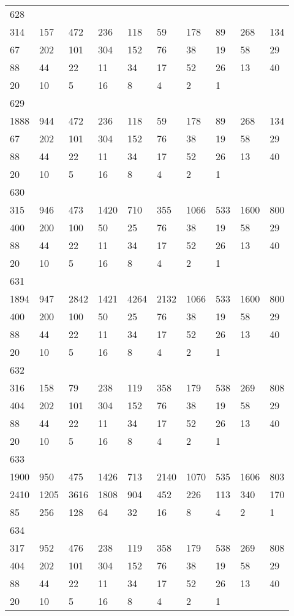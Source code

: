 \begin{longtable}{*{10}{l}}
628&&&&&&&&&\\
314& 157& 472& 236& 118& 59& 178& 89& 268& 134\\
67& 202& 101& 304& 152& 76& 38& 19& 58& 29\\
88& 44& 22& 11& 34& 17& 52& 26& 13& 40\\
20& 10& 5& 16& 8& 4& 2& 1& \\

629&&&&&&&&&\\
1888& 944& 472& 236& 118& 59& 178& 89& 268& 134\\
67& 202& 101& 304& 152& 76& 38& 19& 58& 29\\
88& 44& 22& 11& 34& 17& 52& 26& 13& 40\\
20& 10& 5& 16& 8& 4& 2& 1& \\

630&&&&&&&&&\\
315& 946& 473& 1420& 710& 355& 1066& 533& 1600& 800\\
400& 200& 100& 50& 25& 76& 38& 19& 58& 29\\
88& 44& 22& 11& 34& 17& 52& 26& 13& 40\\
20& 10& 5& 16& 8& 4& 2& 1& \\

631&&&&&&&&&\\
1894& 947& 2842& 1421& 4264& 2132& 1066& 533& 1600& 800\\
400& 200& 100& 50& 25& 76& 38& 19& 58& 29\\
88& 44& 22& 11& 34& 17& 52& 26& 13& 40\\
20& 10& 5& 16& 8& 4& 2& 1& \\

632&&&&&&&&&\\
316& 158& 79& 238& 119& 358& 179& 538& 269& 808\\
404& 202& 101& 304& 152& 76& 38& 19& 58& 29\\
88& 44& 22& 11& 34& 17& 52& 26& 13& 40\\
20& 10& 5& 16& 8& 4& 2& 1& \\

633&&&&&&&&&\\
1900& 950& 475& 1426& 713& 2140& 1070& 535& 1606& 803\\
2410& 1205& 3616& 1808& 904& 452& 226& 113& 340& 170\\
85& 256& 128& 64& 32& 16& 8& 4& 2& 1\\

634&&&&&&&&&\\
317& 952& 476& 238& 119& 358& 179& 538& 269& 808\\
404& 202& 101& 304& 152& 76& 38& 19& 58& 29\\
88& 44& 22& 11& 34& 17& 52& 26& 13& 40\\
20& 10& 5& 16& 8& 4& 2& 1& \\


\end{longtable}
